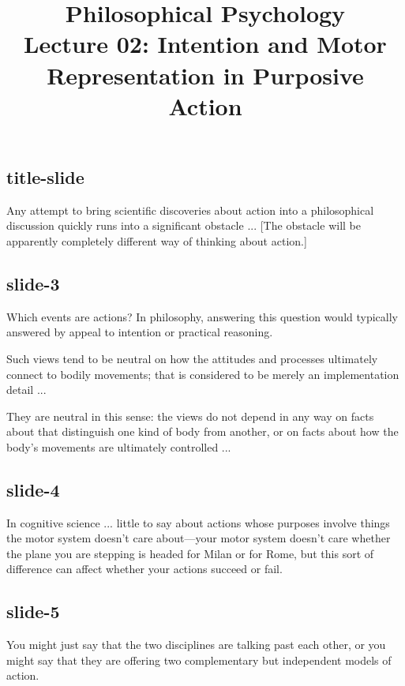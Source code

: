 \documentclass[12pt,\papersize]{extarticle}
\begin{document}
\setlength\footnotesep{1em}









\title {Philosophical Psychology \\ Lecture 02: Intention and Motor Representation in Purposive Action}



\maketitle

\subsection{title-slide}
Any attempt to bring scientific discoveries about action into a philosophical
discussion quickly runs into a significant obstacle ...
[The obstacle will be apparently completely different way of thinking about action.]

\subsection{slide-3}
Which events are actions?
In philosophy, answering this question would typically answered by appeal to intention
or practical reasoning.

Such views tend to be neutral on how
the attitudes and processes ultimately connect to bodily movements;
that is considered to be merely an implementation detail ...

They are neutral in this sense: the views do not depend in any way on facts about that
distinguish one kind of body from another, or on facts about how the body’s movements
are ultimately controlled ...

\subsection{slide-4}
In cognitive science ... little to say about actions whose purposes
involve things the motor system doesn’t care about---your motor system
doesn’t care whether the plane you are stepping is headed for Milan or
for Rome, but this sort of difference can affect whether your actions succeed or fail.

\subsection{slide-5}
You might just say that the two disciplines are talking past each other,
or you might say that they are offering two complementary but independent
models of action.
\end{document}
